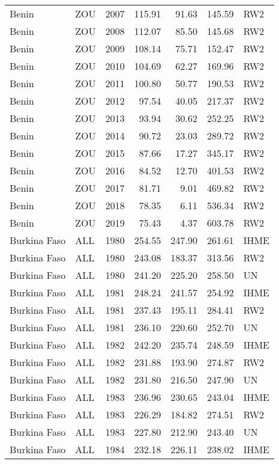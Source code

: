 \begin{longtable}{lllrrrl}
  Benin & ZOU & 2007 & 115.91 & 91.63 & 145.59 & RW2 \\ 
  Benin & ZOU & 2008 & 112.07 & 85.50 & 145.68 & RW2 \\ 
  Benin & ZOU & 2009 & 108.14 & 75.71 & 152.47 & RW2 \\ 
  Benin & ZOU & 2010 & 104.69 & 62.27 & 169.96 & RW2 \\ 
  Benin & ZOU & 2011 & 100.80 & 50.77 & 190.53 & RW2 \\ 
  Benin & ZOU & 2012 & 97.54 & 40.05 & 217.37 & RW2 \\ 
  Benin & ZOU & 2013 & 93.94 & 30.62 & 252.25 & RW2 \\ 
  Benin & ZOU & 2014 & 90.72 & 23.03 & 289.72 & RW2 \\ 
  Benin & ZOU & 2015 & 87.66 & 17.27 & 345.17 & RW2 \\ 
  Benin & ZOU & 2016 & 84.52 & 12.70 & 401.53 & RW2 \\ 
  Benin & ZOU & 2017 & 81.71 & 9.01 & 469.82 & RW2 \\ 
  Benin & ZOU & 2018 & 78.35 & 6.11 & 536.34 & RW2 \\ 
  Benin & ZOU & 2019 & 75.43 & 4.37 & 603.78 & RW2 \\ 
  Burkina Faso & ALL & 1980 & 254.55 & 247.90 & 261.61 & IHME \\ 
  Burkina Faso & ALL & 1980 & 243.08 & 183.37 & 313.56 & RW2 \\ 
  Burkina Faso & ALL & 1980 & 241.20 & 225.20 & 258.50 & UN \\ 
  Burkina Faso & ALL & 1981 & 248.24 & 241.57 & 254.92 & IHME \\ 
  Burkina Faso & ALL & 1981 & 237.43 & 195.11 & 284.41 & RW2 \\ 
  Burkina Faso & ALL & 1981 & 236.10 & 220.60 & 252.70 & UN \\ 
  Burkina Faso & ALL & 1982 & 242.20 & 235.74 & 248.59 & IHME \\ 
  Burkina Faso & ALL & 1982 & 231.88 & 193.90 & 274.87 & RW2 \\ 
  Burkina Faso & ALL & 1982 & 231.80 & 216.50 & 247.90 & UN \\ 
  Burkina Faso & ALL & 1983 & 236.96 & 230.65 & 243.04 & IHME \\ 
  Burkina Faso & ALL & 1983 & 226.29 & 184.82 & 274.51 & RW2 \\ 
  Burkina Faso & ALL & 1983 & 227.80 & 212.90 & 243.40 & UN \\ 
  Burkina Faso & ALL & 1984 & 232.18 & 226.11 & 238.02 & IHME \\ 

\end{longtable}
